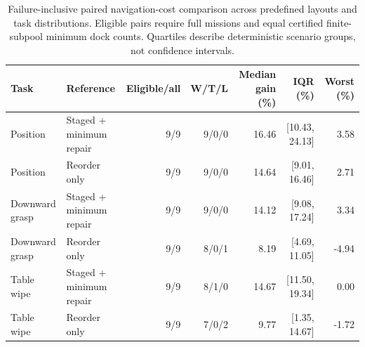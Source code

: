\begin{table}[t]
\centering
\caption{Failure-inclusive paired navigation-cost comparison across predefined layouts and task distributions. Eligible pairs require full missions and equal certified finite-subpool minimum dock counts. Quartiles describe deterministic scenario groups, not confidence intervals.}
\label{tab:task-navigation-robustness}
\begin{tabular}{llrrrrr}
\toprule
Task & Reference & Eligible/all & W/T/L & Median gain (\%) & IQR (\%) & Worst (\%) \\
\midrule
Position & Staged + minimum repair & 9/9 & 9/0/0 & 16.46 & [10.43, 24.13] & 3.58 \\
Position & Reorder only & 9/9 & 9/0/0 & 14.64 & [9.01, 16.46] & 2.71 \\
Downward grasp & Staged + minimum repair & 9/9 & 9/0/0 & 14.12 & [9.08, 17.24] & 3.34 \\
Downward grasp & Reorder only & 9/9 & 8/0/1 & 8.19 & [4.69, 11.05] & -4.94 \\
Table wipe & Staged + minimum repair & 9/9 & 8/1/0 & 14.67 & [11.50, 19.34] & 0.00 \\
Table wipe & Reorder only & 9/9 & 7/0/2 & 9.77 & [1.35, 14.67] & -1.72 \\
\bottomrule
\end{tabular}
\end{table}
